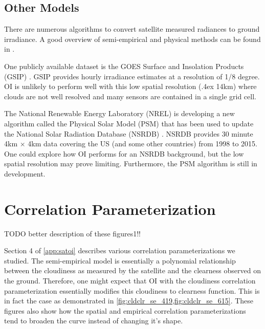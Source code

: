\subsection{Other Models}
There are numerous algorithms to convert satellite measured radiances
to ground irradiance.
A good overview of semi-empirical and physical methods can be found in
\cite{Perez2013a,Miller2013}.

One publicly available dataset is the GOES Surface and Insolation
Products (GSIP) \citep{Sengupta2010}.
GSIP provides hourly irradiance estimates at a resolution of 1/8
degree.
OI is unlikely to perform well with this low spatial resolution
({\raise.4ex \hbox{\texttildelow}}14km) where clouds are not well
resolved and many sensors are contained in a single grid cell.

The National Renewable Energy Laboratory (NREL) is developing a new
algorithm called the Physical Solar Model (PSM) that has been used to update
the National Solar Radiation Database (NSRDB) \citep{Sengupta2014}.
NSRDB provides 30 minute 4km $\times$ 4km data covering the US (and
some other countries) from 1998 to 2015.
One could explore how OI performs for an NSRDB background, but the low
spatial resolution may prove limiting.
Furthermore, the PSM algorithm is still in development.

\section{Correlation Parameterization}
\label{sec:corr_param}

TODO better description of these figures1!!

Section 4 of \cref{app:satoi} describes various correlation
parameterizations we studied.
The semi-empirical model is essentially a polynomial relationship
between the cloudiness as measured by the satellite and the clearness
observed on the ground.
Therefore, one might expect that OI with the cloudiness correlation
parameterization essentially modifies this cloudiness to clearness
function.
This is in fact the case as demonstrated in
\cref{fig:cldclr_se_419,fig:cldclr_se_615}.
These figures also show how the spatial and empirical correlation
parameterizations tend to broaden the curve instead of changing it's
shape.

